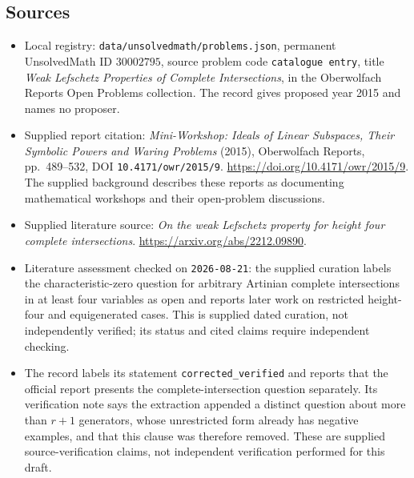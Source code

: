\documentclass[11pt]{article}
\begin{document}
\subsection{Sources}
\begin{itemize}
\item Local registry: \texttt{data/unsolvedmath/problems.json}, permanent UnsolvedMath ID \(30002795\), source problem code \texttt{catalogue entry}, title \emph{Weak Lefschetz Properties of Complete Intersections}, in the Oberwolfach Reports Open Problems collection. The record gives proposed year 2015 and names no proposer.
\item Supplied report citation: \emph{Mini-Workshop: Ideals of Linear Subspaces, Their Symbolic Powers and Waring Problems} (2015), Oberwolfach Reports, pp.\ 489--532, DOI \texttt{10.4171/owr/2015/9}. \url{https://doi.org/10.4171/owr/2015/9}. The supplied background describes these reports as documenting mathematical workshops and their open-problem discussions.
\item Supplied literature source: \emph{On the weak Lefschetz property for height four complete intersections}. \url{https://arxiv.org/abs/2212.09890}.
\item Literature assessment checked on \texttt{2026-08-21}: the supplied curation labels the characteristic-zero question for arbitrary Artinian complete intersections in at least four variables as open and reports later work on restricted height-four and equigenerated cases. This is supplied dated curation, not independently verified; its status and cited claims require independent checking.
\item The record labels its statement \texttt{corrected\_verified} and reports that the official report presents the complete-intersection question separately. Its verification note says the extraction appended a distinct question about more than \(r+1\) generators, whose unrestricted form already has negative examples, and that this clause was therefore removed. These are supplied source-verification claims, not independent verification performed for this draft.
\end{itemize}
\end{document}
